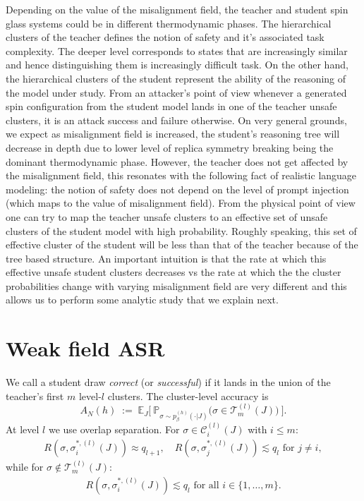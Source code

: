 \documentclass{article}
\theoremstyle{remark} %
\begin{document}
Depending on the value of the misalignment field, the teacher and student spin glass systems could be in different thermodynamic phases. The hierarchical clusters of the teacher defines the notion of safety and it's associated task complexity. The deeper level corresponds to states that are increasingly similar and hence distinguishing them is increasingly difficult task. On the other hand, the hierarchical clusters of the student represent the ability of the reasoning of the model under study.  From an attacker's point of view whenever a generated spin configuration from the student model lands in one of the teacher unsafe clusters, it is an attack success and failure otherwise. On very general grounds, we expect as misalignment field is increased, the student's reasoning tree will decrease in depth due to lower level of replica symmetry breaking being the dominant thermodynamic phase. However, the teacher does not get affected by the misalignment field, this resonates with the following fact of realistic language modeling: the notion of safety does not depend on the level of prompt injection (which maps to the value of misalignment field). From the physical point of view one can try to map the teacher unsafe clusters to an effective set of unsafe clusters of the student model with high probability. Roughly speaking, this set of effective cluster of the student will be less than that of the teacher because of the tree based structure. An important intuition is that the rate at which this effective unsafe student clusters decreases vs the rate at which the the cluster probabilities change with varying misalignment field are very different and this allows us to perform some analytic study that we explain next. 

\section{Weak field ASR}
\label{app:Weak field ASR}


We call a student draw \emph{correct} (or \emph{successful}) if it lands in the union of the teacher's first $m$ level-$l$ clusters. The cluster-level accuracy is
\begin{equation}
A_N(h)\;:=\;\mathbb E_J\Big[\ \mathbb P_{\sigma\sim p^{(h)}_\beta(\cdot \vert J)}\big(\sigma\in\mathcal T^{(l)}_m(J)\big)\ \Big].
\end{equation}
At level $l$ we use overlap separation. For $\sigma \in \mathcal{C}^{(l)}_i(J)$ with $i \leq m$:
\begin{align}
R(\sigma,\sigma^{\ast,(l)}_i(J))\approx q_{l+1}, \quad R(\sigma,\sigma^{\ast,(l)}_j(J))\lesssim q_{l} \text{ for } j \neq i,
\end{align}
while for $\sigma\notin\mathcal T^{(l)}_m(J)$:
\begin{align}
R(\sigma,\sigma^{\ast,(l)}_i(J))\lesssim q_{l} \text{ for all } i \in \{1, \ldots, m\}.
\end{align}
\end{document}
